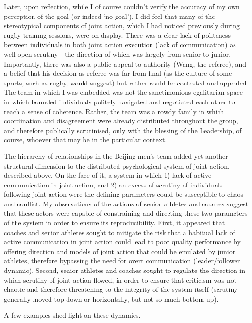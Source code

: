\begin{CJK}{UTF8}{gbsn}
  Later, upon reflection, while I of course couldn't verify the accuracy of my own perception of the goal (or indeed `no-goal'), I did feel that many of the stereotypical components of joint action, which I had noticed previously during rugby training sessions, were on display.  There was a clear lack of politeness between individuals in both joint action execution (lack of communication) as well open scrutiny---the direction of which was largely from senior to junior.  Importantly, there was also a public appeal to authority (Wang, the referee), and a belief that his decision as referee was far from final (as the culture of some sports, such as rugby, would suggest) but rather could be contested and appealed.  The team in which I was embedded was not the sanctimonious egalitarian space in which bounded individuals politely navigated and negotiated each other to reach a sense of coherence.  Rather, the team was a rowdy family in which coordination and disagreement were already distributed throughout the group, and therefore publically scrutinised, only with the blessing of the Leadership, of course, whoever that may be in the particular context.


  The hierarchy of relationships in the Beijing men's team added yet another structural dimension to the distributed psychological system of joint action, described above. On the face of it, a system in which 1) lack of active communication in joint action, and 2) an excess of scrutiny of individuals following joint action were the defining parameters could be susceptible to chaos and conflict.  My observations of the actions of senior athletes and coaches suggest that these actors were capable of constraining and directing these two parameters of the system in order to ensure its reproducibility.   First, it appeared that coaches and senior athletes sought to mitigate the risk that a habitual lack of active communication in joint action could lead to poor quality performance by offering direction and models of joint action that could be emulated by junior athletes, therefore bypassing the need for overt communication (leader/follower dynamic). Second, senior athletes and coaches sought to regulate the direction in which scrutiny of joint action flowed, in order to  ensure that criticism was not chaotic and therefore threatening to the integrity of the system itself (scrutiny generally moved top-down or horizontally, but not so much bottom-up).

  A few examples shed light on these dynamics.


\end{CJK}
